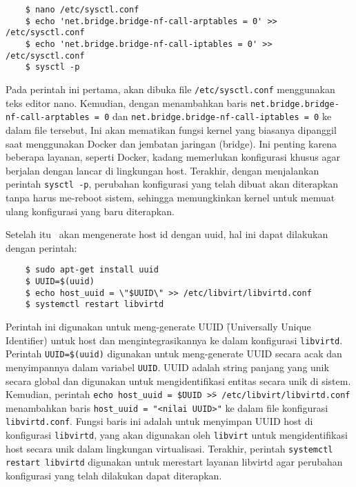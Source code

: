 \begin{listing}[H]
    \begin{verbatim}       
    $ nano /etc/sysctl.conf
    $ echo 'net.bridge.bridge-nf-call-arptables = 0' >> /etc/sysctl.conf
    $ echo 'net.bridge.bridge-nf-call-iptables = 0' >> /etc/sysctl.conf
    $ sysctl -p
    \end{verbatim}
\end{listing}

Pada perintah ini pertama, akan dibuka file \texttt{/etc/sysctl.conf} menggunakan teks editor nano. Kemudian, dengan menambahkan baris \texttt{net.bridge.bridge-nf-call-arptables = 0} dan \texttt{net.bridge.bridge-nf-call-iptables = 0} ke dalam file tersebut, Ini akan mematikan fungsi kernel yang biasanya dipanggil saat menggunakan Docker dan jembatan jaringan (bridge). Ini penting karena beberapa layanan, seperti Docker, kadang memerlukan konfigurasi khusus agar berjalan dengan lancar di lingkungan host. Terakhir, dengan menjalankan perintah \texttt{sysctl -p}, perubahan konfigurasi yang telah dibuat akan diterapkan tanpa harus me-reboot sistem, sehingga memungkinkan kernel untuk memuat ulang konfigurasi yang baru diterapkan.

Setelah itu \saya\ akan mengenerate host id dengan uuid, hal ini dapat dilakukan dengan perintah:

\begin{listing}[H]
    \begin{verbatim}   
    $ sudo apt-get install uuid
    $ UUID=$(uuid)
    $ echo host_uuid = \"$UUID\" >> /etc/libvirt/libvirtd.conf
    $ systemctl restart libvirtd
    \end{verbatim}
\end{listing}

Perintah ini digunakan untuk meng-generate UUID \f{(Universally Unique Identifier)} untuk host dan mengintegrasikannya ke dalam konfigurasi \texttt{libvirtd}. Perintah \texttt{UUID=\$(uuid)} digunakan untuk meng-generate UUID secara acak dan menyimpannya dalam variabel \texttt{UUID}. UUID adalah string panjang yang unik secara global dan digunakan untuk mengidentifikasi entitas secara unik di sistem. Kemudian, perintah \texttt{echo host\_uuid = \" \$UUID \"  >> /etc/libvirt/libvirtd.conf} menambahkan baris \texttt{host\_uuid = "<nilai UUID>"} ke dalam file konfigurasi \texttt{libvirtd.conf}. Fungsi baris ini adalah untuk menyimpan UUID host di konfigurasi \texttt{libvirtd}, yang akan digunakan oleh \texttt{libvirt} untuk mengidentifikasi host secara unik dalam lingkungan virtualisasi. Terakhir, perintah \texttt{systemctl restart libvirtd} digunakan untuk merestart layanan libvirtd agar perubahan konfigurasi yang telah dilakukan dapat diterapkan.


